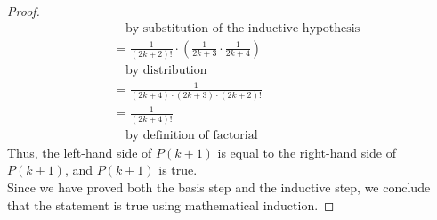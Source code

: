 \documentclass[name=Ojas\ Chaturvedi, emailid=oj.chaturvedi.2024, course=Capstone:\ Discrete\ Math, num=8, deadline={November\ 2,\ 2023}]{homework}
\begin{document}
\begin{proof}
\begin{align*}
        & \quad \text{by substitution of the inductive hypothesis} \\
        &= \frac{1}{(2k+2)!} \cdot \left(\frac{1}{2k+3} \cdot \frac{1}{2k+4} \right) \\
        & \quad \text{by distribution} \\
        &= \frac{1}{(2k+4) \cdot (2k+3) \cdot (2k+2)!} \\
        &= \frac{1}{(2k+4)!} \\
        & \quad \text{by definition of factorial}
    \end{align*}
    Thus, the left-hand side of $P(k+1)$ is equal to the right-hand side of $P(k+1)$, and $P(k+1)$ is true. \\
    Since we have proved both the basis step and the inductive step, we conclude that the statement is true using mathematical induction.
\end{proof}
\end{document}
